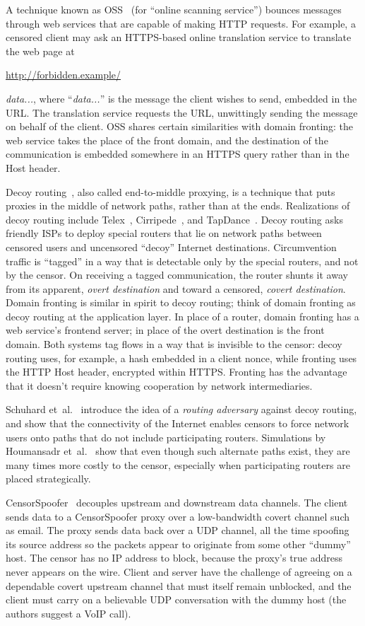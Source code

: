 \documentclass[conference]{IEEEtran}
\def\urll#1{\begin{NoHyper}\url{#1}\end{NoHyper}}
\begin{document}
A technique known as OSS~\cite{oss} (for
``online scanning service'') bounces messages
through web services that are capable of making HTTP requests.
For example, a censored client may ask an HTTPS-based online translation service to
translate the web page at \urll{http://forbidden.example/}\textsl{data...},
where ``\textsl{data...}'' is the message the client wishes to send,
embedded in the URL.
The translation service requests the URL,
unwittingly sending the message on behalf of the client.
OSS shares certain similarities with domain fronting:
the web service takes the place of the front domain,
and the destination of the communication is embedded somewhere in an HTTPS query
rather than in the Host header.

Decoy routing~\cite{decoyrouting}, also called end-to-middle proxying,
is a technique that puts
proxies in the middle of network paths, rather than at the ends.
Realizations of decoy routing include Telex~\cite{telex},
Cirripede~\cite{cirripede}, and TapDance~\cite{tapdance}.
Decoy routing asks friendly ISPs to deploy special routers that lie
on network paths between censored users and uncensored ``decoy'' Internet destinations.
Circumvention traffic is ``tagged'' in a way that is detectable only
by the special routers, and not by the censor.
On receiving a tagged communication, the router shunts it away from its apparent, \emph{overt destination}
and toward a censored, \emph{covert destination}.
Domain fronting is similar in spirit to decoy routing;
think of domain fronting as decoy routing at the application layer.
In place of a router, domain fronting has a web service's frontend server;
in place of the overt destination is the front domain.
Both systems tag flows in a way that is invisible to the censor:
decoy routing uses, for example, a hash embedded in a client nonce,
while fronting uses the HTTP Host header, encrypted within HTTPS.
Fronting has the advantage that it doesn't require knowing cooperation by network intermediaries.

Schuhard et~al.~\cite{ccs2012-decoys}
introduce the idea of a \emph{routing adversary} against decoy routing,
and show that the connectivity of the Internet enables
censors to force network users onto paths that do not include participating routers.
Simulations by Houmansadr et~al.~\cite{nodirectionhome}
show that even though such alternate paths exist,
they are many times more costly to the censor,
especially when participating routers are placed strategically.

CensorSpoofer~\cite{censorspoofer}
decouples upstream and downstream data channels.
The client sends data to a CensorSpoofer proxy over a low-bandwidth covert channel such as email.
The proxy sends data back over a UDP channel, all the time
spoofing its source address so the packets appear to originate from some other ``dummy'' host.
The censor has no IP address to block, because the proxy's true address never appears on the wire.
Client and server have the challenge of agreeing on a dependable covert upstream channel
that must itself remain unblocked,
and the client must carry on a believable UDP conversation with the dummy host
(the authors suggest a VoIP call).
\end{document}
